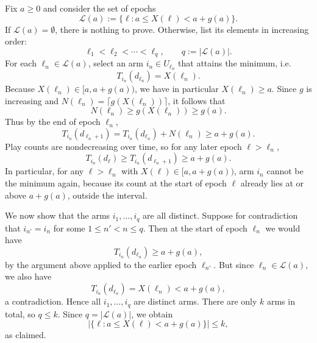 \documentclass[opre,blindrev]{informs3}
\begin{document}
\begin{APPENDICES}
    Fix \(a\ge 0\) and consider the set of epochs
    \[
        \mathcal{L}(a) := \{\ell : a  \leq X(\ell) < a + g(a)\}.
    \]
    If \(\mathcal{L}(a)=\emptyset\), there is nothing to prove. Otherwise, list its
    elements in increasing order:
    \[
        \ell_1 < \ell_2 < \cdots < \ell_q,
        \qquad q := |\mathcal{L}(a)|.
    \]
    For each \(\ell_n \in \mathcal{L}(a)\), select an arm \(i_n \in U_{\ell_n}\) that
    attains the minimum, i.e.
    \[
        T_{i_n}(d_{\ell_n}) = X(\ell_n).
    \]
    Because \(X(\ell_n)\in[a,a+g(a))\), we have in particular \(X(\ell_n)\ge a\).
    Since \(g\) is increasing and \(N(\ell_n)=\lceil g(X(\ell_n))\rceil\), it follows that
    \[
        N(\ell_n) \ge g(X(\ell_n)) \ge g(a).
    \]
    Thus by the end of epoch \(\ell_n\),
    \[
        T_{i_n}(d_{\ell_n + 1})
        = T_{i_n}(d_{\ell_n}) + N(\ell_n)
        \ge
        a + g(a).
    \]
    Play counts are nondecreasing over time, so for any later epoch
    \(\ell > \ell_n\), 
    \[
        T_{i_n}(d_\ell) \ge T_{i_n}(d_{\ell_n+1}) \ge a + g(a).
    \]
    In particular, for any \(\ell > \ell_n\) with \(X(\ell)\in[a,a+g(a))\), arm \(i_n\)
    cannot be the minimum again, because its count at the start of epoch \(\ell\)
    already lies at or above \(a+g(a)\), outside the interval.
    
    We now show that the arms \(i_1,\dots,i_q\) are all distinct. Suppose for
    contradiction that \(i_{n'} = i_n\) for some \(1  \leq n' < n  \leq q\).  Then at the start
    of epoch \(\ell_n\) we would have
    \[
        T_{i_n}(d_{\ell_n}) \ge a + g(a),
    \]
    by the argument above applied to the earlier epoch \(\ell_{n'}\). But since \(\ell_n\in\mathcal{L}(a)\), we also have
    \[
        T_{i_n}(d_{\ell_n}) = X(\ell_n) < a + g(a),
    \]
    a contradiction. Hence all \(i_1,\dots,i_q\) are distinct arms. There are only \(k\) arms in total, so \(q  \leq k\). Since
    \(q = |\mathcal{L}(a)|\), we obtain
    \[
        \bigl|\{\ell : a  \leq X(\ell) < a + g(a)\}\bigr|  \leq k,
    \]
    as claimed.
\Halmos  


\end{APPENDICES}
\end{document}
